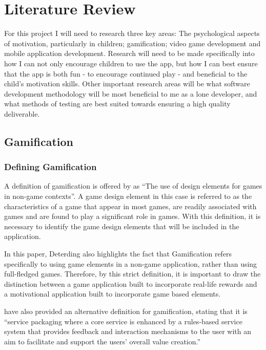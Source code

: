 \chapter{Literature Review}
\label{chap:litReview}

For this project I will need to research three key areas: The psychological aspects of motivation, particularly in children; gamification; video game development and mobile application development.
Research will need to be made specifically into how I can not only encourage children to use the app, but how I can best ensure that the app is both fun - to encourage continued play - and beneficial to the child's motivation skills.
Other important research areas will be what software development methodology will be most beneficial to me as a lone developer, and what methods of testing are best suited towards ensuring a high quality deliverable.

\section{Gamification}
\subsection{Defining Gamification}
A definition of gamification is offered by \cite{Deterding:2011:GDE:2181037.2181040} as ``The use of design elements for games in non-game contexts''. 
A game design element in this case is referred to as the characteristics of a game that appear in most games, are readily associated with games and are found to play a significant role in games.
With this definition, it is necessary to identify the game design elements that will be included in the application. 

In this paper, Deterding also highlights the fact that Gamification refers specifically to using game elements in a non-game application, rather than using full-fledged games.
Therefore, by this strict definition, it is important to draw the distinction between a game application built to incorporate real-life rewards and a motivational application built to incorporate game based elements.

\cite{huotari2011gamification} have also provided an alternative definition for gamification, stating that it is ``service packaging where a core service is enhanced by a rules-based service system that provides feedback and interaction mechanisms to the user with an aim to facilitate and support the users’ overall value creation.''

